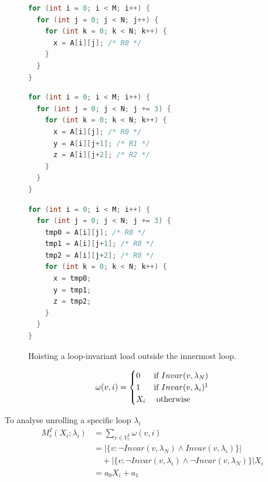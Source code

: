 \begin{figure}[H]
  \centering
  \begin{minipage}[t]{\textwidth}
\begin{lstlisting}[language=C, caption={Original Loop}]
for (int i = 0; i < M; i++) {
  for (int j = 0; j < N; j++) {
    for (int k = 0; k < N; k++) {
      x = A[i][j]; /* R0 */
    }
  }
}
\end{lstlisting}
  \end{minipage}
  \par\medskip
  \begin{minipage}[t]{0.48\textwidth}
\begin{lstlisting}[language=C, caption={After Unroll-and-Jam}]
for (int i = 0; i < M; i++) {
  for (int j = 0; j < N; j += 3) {
    for (int k = 0; k < N; k++) {
      x = A[i][j]; /* R0 */
      y = A[i][j+1]; /* R1 */
      z = A[i][j+2]; /* R2 */
    }
  }
}
\end{lstlisting}
  \end{minipage}%
  \hfill
  \begin{minipage}[t]{0.48\textwidth}
\begin{lstlisting}[language=C,
  caption={Innermost-loop invariant reads after scalar replacement},
  label={lst:ck94-inner-invariant-replaced}]
for (int i = 0; i < M; i++) {
  for (int j = 0; j < N; j += 3) {
    tmp0 = A[i][j]; /* R0 */
    tmp1 = A[i][j+1]; /* R0 */
    tmp2 = A[i][j+2]; /* R0 */
    for (int k = 0; k < N; k++) {
      x = tmp0;
      y = tmp1;
      z = tmp2;
    }
  }
}
\end{lstlisting}
  \end{minipage}
  \caption{Hoisting a loop-invariant load outside the innermost loop.}
  \label{fig:ck94-inner-invariant-replacement}
\end{figure}

\begin{equation}
  \omega(v, i) =
  \begin{cases}
    0 &\text{if } Invar(v, \lambda_{N}) \\
    1 &\text{if } Invar(v, \lambda_{i}) \footnotemark \\
    X_{i} &\text{ otherwise}
  \end{cases}
\end{equation}



To analyse unrolling a specific loop $\lambda_{i}$
\begin{equation}
  \begin{aligned}
    M^{I}_{r}(X_{i}; \lambda_{i}) &= \sum_{v \in V^{I}_{r}} \omega(v, i)
    \\
    &= \left|\{v: \neg Invar(v, \lambda_{N}) \land
      Invar(v, \lambda_{i})\}\right| \\
    &\quad + \left|\{v: \neg Invar(v, \lambda_{i}) \land
      \neg Invar(v, \lambda_{N})\}\right| X_{i} \\
    &= a_{0} X_{i} + a_{1}
  \end{aligned}
\end{equation}

